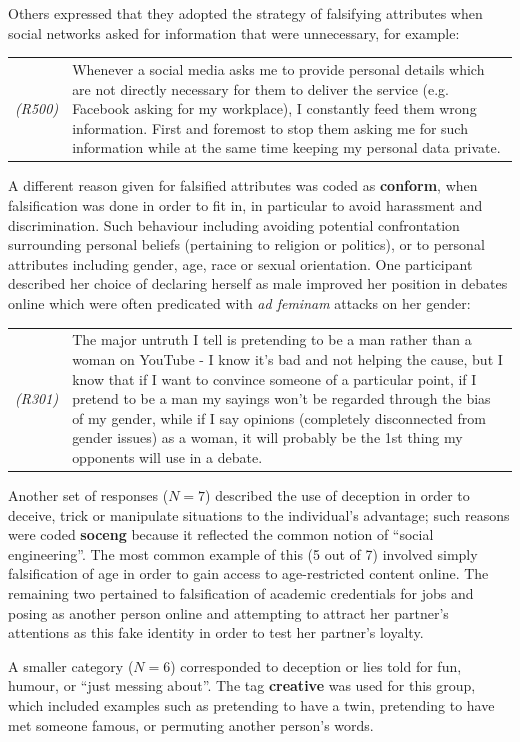 \documentclass{sig-alternate}
\newcommand{\example}[2]{%

\vspace{0.10cm}

\hspace{-3.9ex} \begin{tabular}{ p{0.6cm} p{7.15cm} }
    {\it \small (R#1)} & #2 \\
\end{tabular}%
\vspace{0.10cm}

}
\begin{document}
Others expressed that they adopted the strategy of falsifying attributes when social networks asked for information that were unnecessary, for example:

\example{500}{Whenever a social media asks me to provide personal details which are not directly necessary for them to deliver the service (e.g. Facebook asking for my workplace), I constantly feed them wrong information. First and foremost to stop them asking me for such information while at the same time keeping my personal data private.}

A different reason given for falsified attributes was coded as \textbf{conform}, when falsification was done in order to fit in, in particular to avoid harassment and discrimination.  Such behaviour including avoiding potential confrontation surrounding personal beliefs (pertaining to religion or politics), or to personal attributes including gender, age, race or sexual orientation.  One participant described her choice of declaring herself as male improved her position in debates online which were often predicated with \emph{ad feminam} attacks on her gender:

\example{301}{The major untruth I tell is pretending to be a man rather than a woman on YouTube - I know it's bad and not helping the cause, but I know that if I want to convince someone of a particular point, if I pretend to be a man my sayings won't be regarded through the bias of my gender, while if I say opinions (completely disconnected from gender issues) as a woman, it will probably be the 1st thing my opponents will use in a debate.}

Another set of responses ($N=7$) described the use of deception in order to deceive, trick or manipulate situations to the individual's advantage; such reasons were coded \textbf{soceng} because it reflected the common notion of ``social engineering''.  The most common example of this (5 out of 7) involved simply falsification of age in order to gain access to age-restricted content online. The remaining two pertained to falsification of academic credentials for jobs and posing as another person online and attempting to attract her partner's attentions as this fake identity in order to test her partner's loyalty.

A smaller category  ($N=6$) corresponded to deception or lies told for fun, humour, or ``just messing about''. The tag \textbf{creative} was used for this group, which included examples such as pretending to have a twin, pretending to have met someone famous, or permuting another person's words.  
\end{document}
